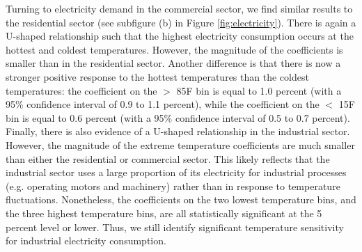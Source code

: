 \documentclass[11pt]{article}
\begin{document}
Turning to electricity demand in the commercial sector, we find similar results to the residential sector (see subfigure (b) in Figure \ref{fig:electricity}). There is again a U-shaped relationship such that the highest electricity consumption occurs at the hottest and coldest temperatures. However, the magnitude of the coefficients is smaller than in the residential sector. Another difference is that there is now a stronger positive response to the hottest temperatures than the coldest temperatures: the coefficient on the $>$ 85\degree F bin is equal to 1.0 percent (with a 95\% confidence interval of 0.9 to 1.1 percent), while the coefficient on the $<$ 15\degree F bin is equal to 0.6 percent (with a 95\% confidence interval of 0.5 to 0.7 percent). Finally, there is also evidence of a U-shaped relationship in the industrial sector. However, the magnitude of the extreme temperature coefficients are much smaller than either the residential or commercial sector. This likely reflects that the industrial sector uses a large proportion of its electricity for industrial processes (e.g. operating motors and machinery) rather than in response to temperature fluctuations. Nonetheless, the coefficients on the two lowest temperature bins, and the three highest temperature bins, are all statistically significant at the 5 percent level or lower. Thus, we still identify significant temperature sensitivity for industrial electricity consumption.
\end{document}
